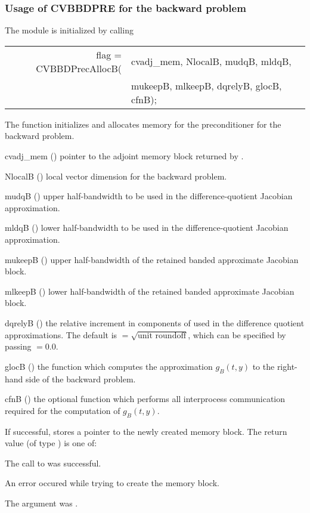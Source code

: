\subsubsection{Usage of CVBBDPRE for the backward problem}
The {\cvbbdpre} module is initialized by calling
{
  \begin{tabular}[t]{@{}r@{}l@{}}
    flag = CVBBDPrecAllocB(&cvadj\_mem, NlocalB, mudqB, mldqB, \\
                           &mukeepB, mlkeepB, dqrelyB, glocB, cfnB);
  \end{tabular}
}
{
  The function  initializes and allocates
  memory for the {\cvbbdpre} preconditioner for the backward problem.
}
{
  \begin{args}
  \item[cvadj\_mem] ()
    pointer to the adjoint memory block returned by .
  \item[NlocalB] ()
    local vector dimension for the backward problem.
  \item[mudqB] ()
    upper half-bandwidth to be used in the difference-quotient Jacobian approximation.
  \item[mldqB] ()
    lower half-bandwidth to be used in the difference-quotient Jacobian approximation.
  \item[mukeepB] ()
    upper half-bandwidth of the retained banded approximate Jacobian block.
  \item[mlkeepB] ()
    lower half-bandwidth of the retained banded approximate Jacobian block.
  \item[dqrelyB] ()
    the relative increment in components of  used in the difference quotient
    approximations.  The default is $ = \sqrt{\text{unit roundoff}}$, which
    can be specified by passing $ = 0.0$.
  \item[glocB] ()
    the {\C} function which computes the approximation $g_B(t,y)$ to the right-hand
    side of the backward problem. 
  \item[cfnB] ()
    the optional {\C} function which performs all interprocess communication required for
    the computation of $g_B(t,y)$.
  \end{args}
}
{
  If successful,  stores a pointer to the newly created 
  {\cvbbdpre} memory block.
  The return value  (of type ) is one of:
  \begin{args}
  \item[\Id{CVBBDPRE\_SUCCESS}]
    The call to  was successful.
  \item[\Id{CVBBDPRE\_PDATA\_NULL}]
    An error occured while trying to create the {\cvbbdpre} memory block.
  \item[\Id{CVBBDPRE\_ADJMEM\_NULL}]
    The  argument was .
  \end{args}
}
